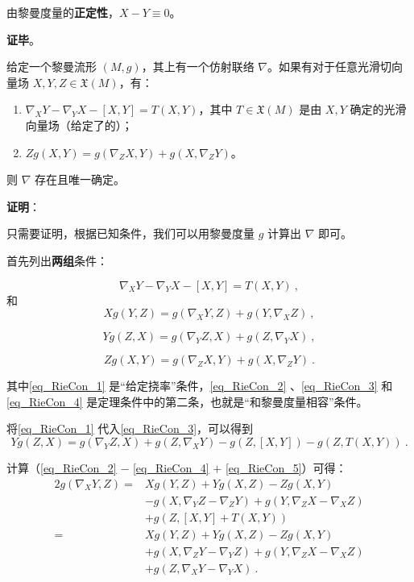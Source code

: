 由黎曼度量的\textbf{正定性}，$X-Y\equiv 0$。

\textbf{证毕}。






\begin{theorem}{}\label{the_RieCon_1}
给定一个黎曼流形 $(M, g)$，其上有一个仿射联络 $\nabla$。如果有对于任意光滑切向量场 $X, Y, Z\in\mathfrak{X}(M)$，有：
\begin{enumerate}
\item $\nabla_XY-\nabla_YX-[X, Y]=T(X, Y)$，其中 $T\in \mathfrak{X}(M)$ 是由 $X, Y$ 确定的光滑向量场（给定了的）；
\item $Zg(X, Y)=g(\nabla_ZX, Y)+g(X, \nabla_ZY)$。
\end{enumerate}
则 $\nabla$ 存在且唯一确定。
\end{theorem}

\textbf{证明}：

只需要证明，根据已知条件，我们可以用黎曼度量 $g$ 计算出 $\nabla$ 即可。

首先列出\textbf{两组}条件：

\begin{equation}\label{eq_RieCon_1}
\nabla_XY-\nabla_YX-[X, Y]=T(X, Y)~,
\end{equation}
和
\begin{equation}\label{eq_RieCon_2}
Xg(Y, Z)=g(\nabla_XY, Z)+g(Y, \nabla_XZ)~,
\end{equation}

\begin{equation}\label{eq_RieCon_3}
Yg(Z, X)=g(\nabla_YZ, X)+g(Z, \nabla_YX)~,
\end{equation}

\begin{equation}\label{eq_RieCon_4}
Zg(X, Y)=g(\nabla_ZX, Y)+g(X, \nabla_ZY)~.
\end{equation}


其中\autoref{eq_RieCon_1} 是“给定挠率”条件，\autoref{eq_RieCon_2} 、\autoref{eq_RieCon_3} 和\autoref{eq_RieCon_4} 是定理条件中的第二条，也就是“和黎曼度量相容”条件。

将\autoref{eq_RieCon_1} 代入\autoref{eq_RieCon_3}，可以得到
\begin{equation}\label{eq_RieCon_5}
Yg(Z, X)=g(\nabla_YZ, X)+g(Z, \nabla_XY)-g(Z, [X, Y])-g(Z, T(X, Y))~.
\end{equation}

计算（\autoref{eq_RieCon_2} $-$ \autoref{eq_RieCon_4} $+$ \autoref{eq_RieCon_5}）可得：
\begin{equation}\label{eq_RieCon_6}
\begin{aligned}
2g(\nabla_XY, Z)=&Xg(Y, Z)+Yg(X, Z)-Zg(X, Y)\\&-g(X, \nabla_YZ-\nabla_ZY)+g(Y, \nabla_ZX-\nabla_XZ)\\&+g(Z, [X, Y]+T(X, Y))\\
=&Xg(Y, Z)+Yg(X, Z)-Zg(X, Y)\\&+g(X, \nabla_ZY-\nabla_YZ)+g(Y, \nabla_ZX-\nabla_XZ)\\&+g(Z, \nabla_XY-\nabla_YX)~.
\end{aligned}
\end{equation}

